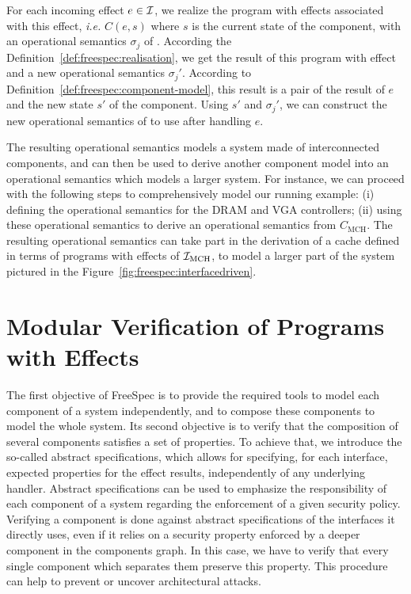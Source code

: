 For each incoming effect \( e \in \mathcal{I} \), we realize the program with effects
associated with this effect, \emph{i.e.} \( C(e, s) \) where \( s \) is the
current state of the component, with an operational semantics \( \sigma_j \) of
\J.
%
According the Definition~\ref{def:freespec:realisation}, we get the result of
this program with effect and a new operational semantics \( \sigma_j' \).
%
According to Definition~\ref{def:freespec:component-model}, this result is a
pair of the result of \( e \) and the new state \( s' \) of the component.
%
Using \( s' \) and \( \sigma_j' \), we can construct the new operational
semantics of \I to use after handling \( e \).

%
The resulting operational semantics models a system made of interconnected
components, and can then be used to derive another component model into an
operational semantics which models a larger system.
%
For instance, we can proceed with the following steps to comprehensively model
our running example: (i) defining the operational semantics for the DRAM and VGA
controllers; (ii) using these operational semantics to derive an operational
semantics from $C_{\mathrm{MCH}}$.
%
The resulting operational semantics can take part in the derivation of a cache
defined in terms of programs with effects of $\mathcal{I}_{\mathrm{MCH}}$, to model a
larger part of the system pictured in the
Figure~\ref{fig:freespec:interfacedriven}.

\section{Modular Verification of Programs with Effects}
\label{sec:freespec:verifying}

The first objective of FreeSpec is to provide the required tools to model each
component of a system independently, and to compose these components to model
the whole system.
%
Its second objective is to verify that the composition of several components
satisfies a set of properties.
%
To achieve that, we introduce the so-called abstract specifications, which
allows for specifying, for each interface, expected properties for the effect
results, independently of any underlying handler.
%
Abstract specifications can be used to emphasize the responsibility of each
component of a system regarding the enforcement of a given security policy.
%
Verifying a component is done against abstract specifications of the interfaces
it directly uses, even if it relies on a security property enforced by a deeper
component in the components graph.
%
In this case, we have to verify that every single component which separates them
preserve this property.
%
This procedure can help to prevent or uncover architectural attacks.

